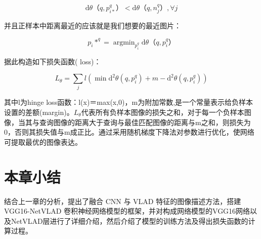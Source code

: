 \begin{equation}
\mathrm { d } \theta（q,p_{i*}^q）< \mathrm { d } \theta（q,n_j^q）,\forall j
\end{equation}

并且正样本中距离最近的应该就是我们想要的最近图片：

\begin{equation}
p_i*^q = \mathop{\arg\min}_{p_i^q}\mathrm { d } \theta（q,p_i^q）
\end{equation}

据此构造如下损失函数( loss)：

\begin{equation}
L_\theta = \sum_{j} l(\mathop {\min}\mathrm { d } ^2 \theta(q,p_i^q)+m-\mathrm { d } ^2 \theta(q,p_i^q))
\end{equation}

其中l为hinge loss函数：l(x)＝max(x,0)，m为附加常数,是一个常量表示给负样本设置的差额(margin)。$L_\theta$代表所有负样本图像的损失之和，对于每一个负样本图像，当其与查询图像的距离大于查询与最佳匹配图像的距离与m之和，则损失为0，否则其损失值与m成正比。通过采用随机梯度下降法对参数进行优化，使网络可提取最优的图像表达。

\section{本章小结}
结合上一章的分析，提出了融合 CNN 与 VLAD 特征的图像描述方法，搭建 VGG16-NetVLAD 卷积神经网络模型的框架，并对构成网络模型的VGG16网络以及NetVLAD层进行了详细介绍，然后介绍了模型的训练方法及得出损失函数的计算过程。

\clearpage
\endinput
